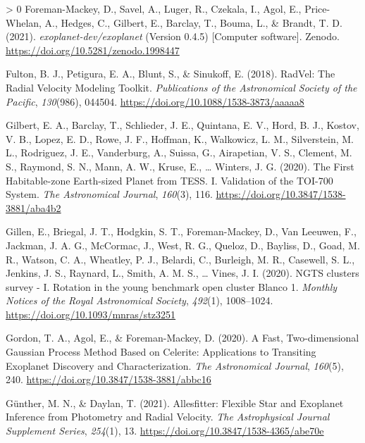 \documentclass[10pt,a4paper,onecolumn]{article}
\newlength{\cslhangindent}
\newenvironment{CSLReferences}[3] %
 {%
  \setlength{\parindent}{0pt}
  \ifodd #1 \everypar{\setlength{\hangindent}{\cslhangindent}}\ignorespaces\fi
  \ifnum #2 > 0
  \setlength{\parskip}{#2\baselineskip}
  \fi
 }%
 {}
\begin{document}
\begin{CSLReferences}{1}{0}
\leavevmode\hypertarget{ref-zenodo}{}%
Foreman-Mackey, D., Savel, A., Luger, R., Czekala, I., Agol, E.,
Price-Whelan, A., Hedges, C., Gilbert, E., Barclay, T., Bouma, L., \&
Brandt, T. D. (2021). \emph{{exoplanet-dev/exoplanet}} (Version 0.4.5)
{[}Computer software{]}. Zenodo.
\url{https://doi.org/10.5281/zenodo.1998447}

\leavevmode\hypertarget{ref-fulton18}{}%
Fulton, B. J., Petigura, E. A., Blunt, S., \& Sinukoff, E. (2018).
{RadVel: The Radial Velocity Modeling Toolkit}. \emph{Publications of
the Astronomical Society of the Pacific}, \emph{130}(986), 044504.
\url{https://doi.org/10.1088/1538-3873/aaaaa8}

\leavevmode\hypertarget{ref-gilbert20}{}%
Gilbert, E. A., Barclay, T., Schlieder, J. E., Quintana, E. V., Hord, B.
J., Kostov, V. B., Lopez, E. D., Rowe, J. F., Hoffman, K., Walkowicz, L.
M., Silverstein, M. L., Rodriguez, J. E., Vanderburg, A., Suissa, G.,
Airapetian, V. S., Clement, M. S., Raymond, S. N., Mann, A. W., Kruse,
E., \ldots{} Winters, J. G. (2020). {The First Habitable-zone
Earth-sized Planet from TESS. I. Validation of the TOI-700 System}.
\emph{The Astronomical Journal}, \emph{160}(3), 116.
\url{https://doi.org/10.3847/1538-3881/aba4b2}

\leavevmode\hypertarget{ref-gillen20}{}%
Gillen, E., Briegal, J. T., Hodgkin, S. T., Foreman-Mackey, D., Van
Leeuwen, F., Jackman, J. A. G., McCormac, J., West, R. G., Queloz, D.,
Bayliss, D., Goad, M. R., Watson, C. A., Wheatley, P. J., Belardi, C.,
Burleigh, M. R., Casewell, S. L., Jenkins, J. S., Raynard, L., Smith, A.
M. S., \ldots{} Vines, J. I. (2020). {NGTS clusters survey - I. Rotation
in the young benchmark open cluster Blanco 1}. \emph{Monthly Notices of
the Royal Astronomical Society}, \emph{492}(1), 1008--1024.
\url{https://doi.org/10.1093/mnras/stz3251}

\leavevmode\hypertarget{ref-gordon20}{}%
Gordon, T. A., Agol, E., \& Foreman-Mackey, D. (2020). {A Fast,
Two-dimensional Gaussian Process Method Based on Celerite: Applications
to Transiting Exoplanet Discovery and Characterization}. \emph{The
Astronomical Journal}, \emph{160}(5), 240.
\url{https://doi.org/10.3847/1538-3881/abbc16}

\leavevmode\hypertarget{ref-guenther20}{}%
Günther, M. N., \& Daylan, T. (2021). {Allesfitter: Flexible Star and
Exoplanet Inference from Photometry and Radial Velocity}. \emph{The
Astrophysical Journal Supplement Series}, \emph{254}(1), 13.
\url{https://doi.org/10.3847/1538-4365/abe70e}


\end{CSLReferences}
\end{document}
